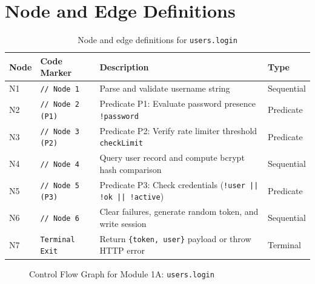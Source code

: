 \documentclass[12pt, a4paper]{report}
\begin{document}
\section{Node and Edge Definitions}
\begin{table}[H]
\centering
\footnotesize
\begin{tabularx}{\textwidth}{L{1.5cm} L{3.5cm} L{8.5cm} L{1.8cm}}
\toprule
\textbf{Node} & \textbf{Code Marker} & \textbf{Description} & \textbf{Type} \\
\midrule
N1 & \texttt{// Node 1} & Parse and validate username string & Sequential \\
N2 & \texttt{// Node 2 (P1)} & Predicate P1: Evaluate password presence \texttt{!password} & Predicate \\
N3 & \texttt{// Node 3 (P2)} & Predicate P2: Verify rate limiter threshold \texttt{checkLimit} & Predicate \\
N4 & \texttt{// Node 4} & Query user record and compute bcrypt hash comparison & Sequential \\
N5 & \texttt{// Node 5 (P3)} & Predicate P3: Check credentials (\texttt{!user || !ok || !active}) & Predicate \\
N6 & \texttt{// Node 6} & Clear failures, generate random token, and write session & Sequential \\
N7 & \texttt{Terminal Exit} & Return \texttt{\{token, user\}} payload or throw HTTP error & Terminal \\
\bottomrule
\end{tabularx}
\caption{Node and edge definitions for \texttt{users.login}}
\label{tab:nodes_1a}
\end{table}

\begin{figure}[H]
\centering
{}
\caption{Control Flow Graph for Module 1A: \texttt{users.login}}
\label{fig:cfg_1a}
\end{figure}
\end{document}
